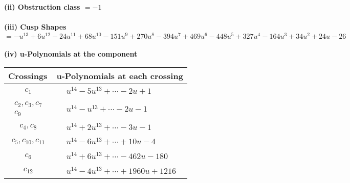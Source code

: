 \documentclass[1p]{elsarticle_modified}
\theoremstyle{definition}
\begin{document}
\flushleft \textbf{(ii) Obstruction class $= -1$}\\~\\
\flushleft \textbf{(iii) Cusp Shapes $= - u^{13}+6 u^{12}-24 u^{11}+68 u^{10}-151 u^9+270 u^8-394 u^7+469 u^6-448 u^5+327 u^4-164 u^3+34 u^2+24 u-26$}\\~\\
\newpage\renewcommand{\arraystretch}{1}
\flushleft \textbf{(iv) u-Polynomials at the component}\newline \\
\begin{tabular}{m{50pt}|m{274pt}}
Crossings & \hspace{64pt}u-Polynomials at each crossing \\
\hline $$\begin{aligned}c_{1}\end{aligned}$$&$\begin{aligned}
&u^{14}-5 u^{13}+\cdots-2 u+1
\end{aligned}$\\
\hline $$\begin{aligned}c_{2},c_{3},c_{7}\\c_{9}\end{aligned}$$&$\begin{aligned}
&u^{14}- u^{13}+\cdots-2 u-1
\end{aligned}$\\
\hline $$\begin{aligned}c_{4},c_{8}\end{aligned}$$&$\begin{aligned}
&u^{14}+2 u^{13}+\cdots-3 u-1
\end{aligned}$\\
\hline $$\begin{aligned}c_{5},c_{10},c_{11}\end{aligned}$$&$\begin{aligned}
&u^{14}-6 u^{13}+\cdots+10 u-4
\end{aligned}$\\
\hline $$\begin{aligned}c_{6}\end{aligned}$$&$\begin{aligned}
&u^{14}+6 u^{13}+\cdots-462 u-180
\end{aligned}$\\
\hline $$\begin{aligned}c_{12}\end{aligned}$$&$\begin{aligned}
&u^{14}-4 u^{13}+\cdots+1960 u+1216
\end{aligned}$\\
\hline
\end{tabular}\\~\\
\end{document}
